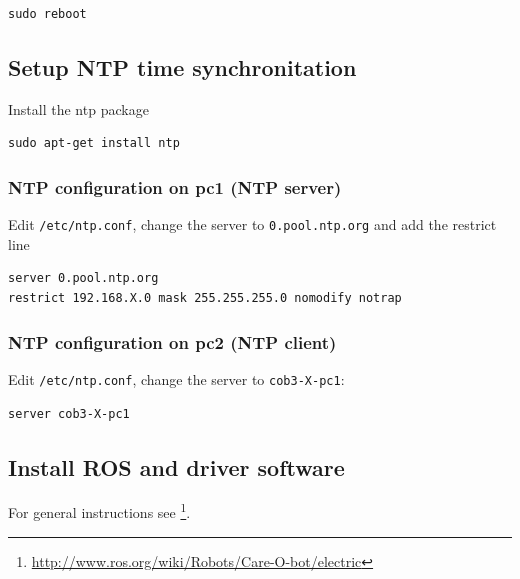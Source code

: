 \begin{lstlisting} 
sudo reboot
\end{lstlisting}

\subsection{Setup NTP time synchronitation}
Install the ntp package

\begin{lstlisting}
sudo apt-get install ntp
\end{lstlisting}

\subsubsection{NTP configuration on pc1 (NTP server)}
Edit \texttt{/etc/ntp.conf}, change the server to \texttt{0.pool.ntp.org} and add the restrict line

\begin{lstlisting} 
server 0.pool.ntp.org
restrict 192.168.X.0 mask 255.255.255.0 nomodify notrap
\end{lstlisting}

\subsubsection{NTP configuration on pc2 (NTP client)}
Edit \texttt{/etc/ntp.conf}, change the server to \texttt{cob3-X-pc1}:
\begin{lstlisting}
server cob3-X-pc1
\end{lstlisting}

\subsection{Install ROS and driver software}
For general instructions see \footnote{\url{http://www.ros.org/wiki/Robots/Care-O-bot/electric}}.

